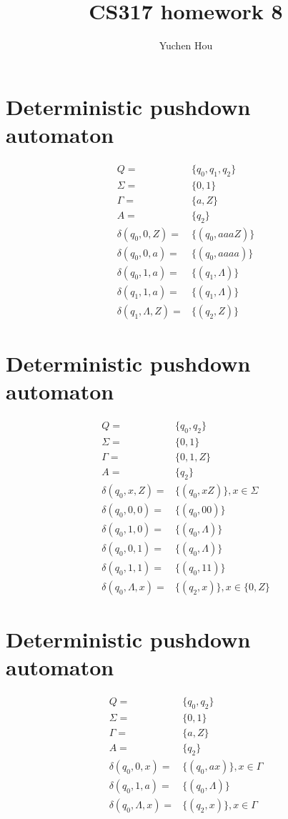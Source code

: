 \documentclass{article}
\begin{document}
\lstset{language=Java}
\title{CS317 homework 8}
\author{Yuchen Hou}
\maketitle
\section{Deterministic pushdown automaton}
\begin{align*}
Q =& \{q_0, q_1, q_2\}\\
\Sigma =& \{0, 1\}\\
\Gamma =& \{a, Z\}\\
A =& \{q_2\}\\
\delta(q_0, 0, Z) =& \{(q_0, aaaZ)\}\\
\delta(q_0, 0, a) =& \{(q_0, aaaa)\}\\
\delta(q_0, 1, a) =& \{(q_1, \Lambda)\}\\
\delta(q_1, 1, a) =& \{(q_1, \Lambda)\}\\
\delta(q_1, \Lambda, Z) =& \{(q_2, Z)\}
\end{align*}
\section{Deterministic pushdown automaton}
\begin{align*}
Q =& \{q_0, q_2\}\\
\Sigma =& \{0, 1\}\\
\Gamma =& \{0, 1, Z\}\\
A =& \{q_2\}\\
\delta(q_0, x, Z) =& \{(q_0, xZ)\}, x \in \Sigma\\
\delta(q_0, 0, 0) =& \{(q_0, 00)\}\\
\delta(q_0, 1, 0) =& \{(q_0, \Lambda)\}\\
\delta(q_0, 0, 1) =& \{(q_0, \Lambda)\}\\
\delta(q_0, 1, 1) =& \{(q_0, 11)\}\\
\delta(q_0, \Lambda, x) =& \{(q_2, x)\}, x \in \{0, Z\}
\end{align*}
\section{Deterministic pushdown automaton}
\begin{align*}
Q =& \{q_0, q_2\}\\
\Sigma =& \{0, 1\}\\
\Gamma =& \{a, Z\}\\
A =& \{q_2\}\\
\delta(q_0, 0, x) =& \{(q_0, ax)\}, x \in \Gamma\\
\delta(q_0, 1, a) =& \{(q_0, \Lambda)\}\\
\delta(q_0, \Lambda, x) =& \{(q_2, x)\}, x \in \Gamma
\end{align*}
\end{document}
